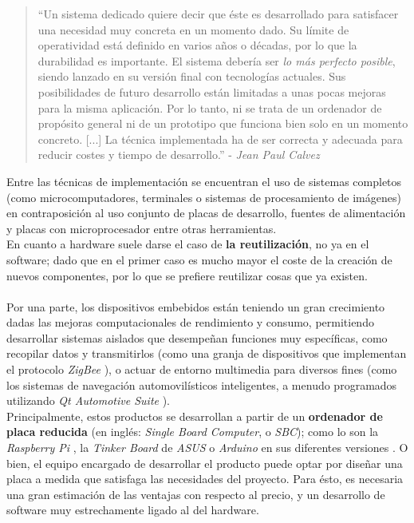 \begin{quotation}
	``Un sistema dedicado quiere decir que éste es desarrollado para satisfacer una necesidad muy concreta en un momento dado. Su límite de operatividad está definido en varios años o décadas, por lo que la durabilidad es importante. El sistema debería ser \textit{lo más perfecto posible}, siendo lanzado en su versión final con tecnologías actuales. Sus posibilidades de futuro desarrollo están limitadas a unas pocas mejoras para la misma aplicación. Por lo tanto, ni se trata de un ordenador de propósito general ni de un prototipo que funciona bien solo en un momento concreto. [...] La técnica implementada ha de ser correcta y adecuada para reducir costes y tiempo de desarrollo.'' - \textit{Jean Paul Calvez} \cite{embedded-real-time-systems-embedded-systems}
\end{quotation}

Entre las técnicas de implementación se encuentran el uso de sistemas completos (como microcomputadores, terminales o sistemas de procesamiento de imágenes) en contraposición al uso conjunto de placas de desarrollo, fuentes de alimentación y placas con microprocesador entre otras herramientas.\\

En cuanto a hardware suele darse el caso de \textbf{la reutilización}, no ya en el software; dado que en el primer caso es mucho mayor el coste de la creación de nuevos componentes, por lo que se prefiere reutilizar cosas que ya existen.\\

\noindent\makebox[\linewidth]{\rule{\textwidth}{0.4pt}}\\

Por una parte, los dispositivos embebidos están teniendo un gran crecimiento dadas las mejoras computacionales de rendimiento y consumo, permitiendo desarrollar sistemas aislados que desempeñan funciones muy específicas, como recopilar datos y transmitirlos (como una granja de dispositivos que implementan el protocolo \textit{ZigBee} \cite{zigbee-products}), o actuar de entorno multimedia para diversos fines (como los sistemas de navegación automovilísticos inteligentes, a menudo programados utilizando \textit{Qt Automotive Suite} \cite{qt-automotive}).\\

Principalmente, estos productos se desarrollan a partir de un \textbf{ordenador de placa reducida} (en inglés: \textit{Single Board Computer}, o \textit{SBC}); como lo son la \textit{Raspberry Pi} \cite{raspberry-pi}, la \textit{Tinker Board} de \textit{ASUS} \cite{asus-tinkerboard} o \textit{Arduino} en sus diferentes versiones \cite{arduino-store}. O bien, el equipo encargado de desarrollar el producto puede optar por diseñar una placa a medida que satisfaga las necesidades del proyecto. Para ésto, es necesaria una gran estimación de las ventajas con respecto al precio, y un desarrollo de software muy estrechamente ligado al del hardware.\\

